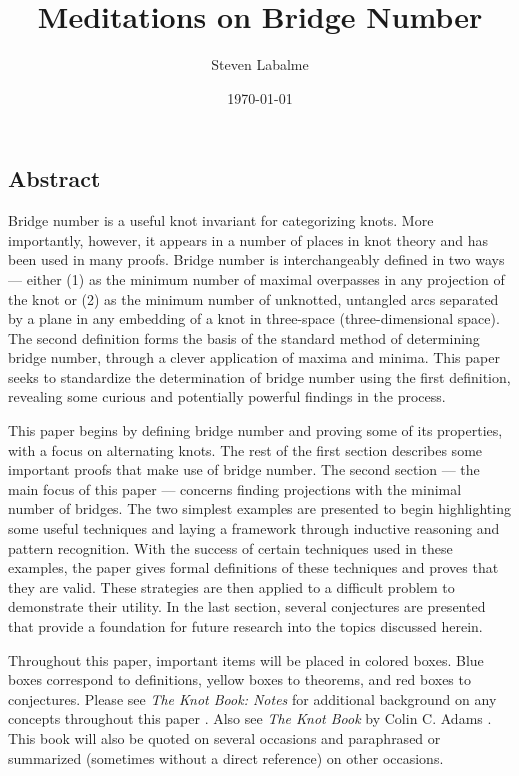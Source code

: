 \documentclass[titlepage]{article}
\title{Meditations on Bridge Number}
\author{Steven Labalme}
\date{\today}
\begin{document}
\maketitle



\tableofcontents
\listoffigures
\listoftables
\newpage



\pagestyle{fancy}
\fancyhf{}
\renewcommand{\headrulewidth}{0pt}
\setcounter{secnumdepth}{0}
\begin{center}
    \section{Abstract}
\end{center}
Bridge number is a useful knot invariant for categorizing knots. More importantly, however, it appears in a number of places in knot theory and has been used in many proofs. Bridge number is interchangeably defined in two ways --- either (1) as the minimum number of maximal overpasses in any projection of the knot or (2) as the minimum number of unknotted, untangled arcs separated by a plane in any embedding of a knot in three-space (three-dimensional space). The second definition forms the basis of the standard method of determining bridge number, through a clever application of maxima and minima. This paper seeks to standardize the determination of bridge number using the first definition, revealing some curious and potentially powerful findings in the process.\par
This paper begins by defining bridge number and proving some of its properties, with a focus on alternating knots. The rest of the first section describes some important proofs that make use of bridge number. The second section --- the main focus of this paper --- concerns finding projections with the minimal number of bridges. The two simplest examples are presented to begin highlighting some useful techniques and laying a framework through inductive reasoning and pattern recognition. With the success of certain techniques used in these examples, the paper gives formal definitions of these techniques and proves that they are valid. These strategies are then applied to a difficult problem to demonstrate their utility. In the last section, several conjectures are presented that provide a foundation for future research into the topics discussed herein.\par
Throughout this paper, important items will be placed in colored boxes. Blue boxes correspond to definitions, yellow boxes to theorems, and red boxes to conjectures. Please see \emph{The Knot Book: Notes} for additional background on any concepts throughout this paper \cite{bib:knotnotes}. Also see \emph{The Knot Book} by Colin C. Adams \cite{bib:knotbook}. This book will also be quoted on several occasions and paraphrased or summarized (sometimes without a direct reference) on other occasions.
\newpage
\end{document}
